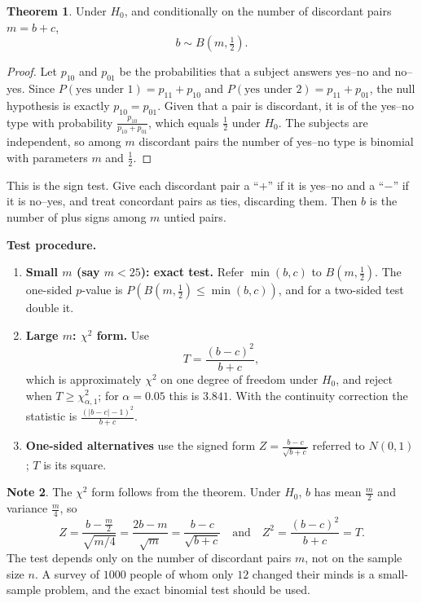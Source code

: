 \documentclass[11pt,a4paper]{article}
\theoremstyle{definition}
\newtheorem{thm}{Theorem}[section]
\newtheorem{note}[thm]{Note}
\begin{document}
\begin{thm}
Under $H_0$, and conditionally on the number of discordant pairs $m = b+c$,
\[b\sim B\left(m, \tfrac12\right).\]
\end{thm}

\begin{proof}
Let $p_{10}$ and $p_{01}$ be the probabilities that a subject answers yes--no and
no--yes. Since $P(\text{yes under 1}) = p_{11}+p_{10}$ and
$P(\text{yes under 2}) = p_{11}+p_{01}$, the null hypothesis is exactly
$p_{10} = p_{01}$. Given that a pair is discordant, it is of the yes--no type with
probability $\frac{p_{10}}{p_{10}+p_{01}}$, which equals $\frac12$ under $H_0$. The
subjects are independent, so among $m$ discordant pairs the number of yes--no type is
binomial with parameters $m$ and $\frac12$.
\end{proof}

This is the sign test. Give each discordant pair a ``$+$'' if it is yes--no and a
``$-$'' if it is no--yes, and treat concordant pairs as ties, discarding them. Then $b$
is the number of plus signs among $m$ untied pairs.

\textbf{Test procedure.}
\begin{enumerate}
\item[(i).] \textbf{Small $m$ (say $m<25$): exact test.} Refer $\min(b,c)$ to
$B\left(m,\frac12\right)$. The one-sided $p$-value is $P\left(B\left(m,\frac12\right)\leq\min(b,c)\right)$,
and for a two-sided test double it.
\item[(ii).] \textbf{Large $m$: $\chi^{2}$ form.} Use
\[T = \frac{(b-c)^{2}}{b+c},\]
which is approximately $\chi^{2}$ on one degree of freedom under $H_0$, and reject when
$T\geq\chi^{2}_{\alpha,1}$; for $\alpha = 0.05$ this is $3.841$. With the continuity
correction the statistic is $\frac{(|b-c|-1)^{2}}{b+c}$.
\item[(iii).] \textbf{One-sided alternatives} use the signed form
$Z = \frac{b-c}{\sqrt{b+c}}$ referred to $N(0,1)$; $T$ is its square.
\end{enumerate}

\begin{note}
The $\chi^{2}$ form follows from the theorem. Under $H_0$, $b$ has mean $\frac{m}{2}$ and
variance $\frac{m}{4}$, so
\[Z = \frac{b-\frac{m}{2}}{\sqrt{m/4}} = \frac{2b-m}{\sqrt{m}} = \frac{b-c}{\sqrt{b+c}}
\quad\text{and}\quad Z^{2} = \frac{(b-c)^{2}}{b+c} = T.\]
The test depends only on the number of discordant pairs $m$, not on the sample size $n$.
A survey of $1000$ people of whom only $12$ changed their minds is a small-sample
problem, and the exact binomial test should be used.
\end{note}
\end{document}
